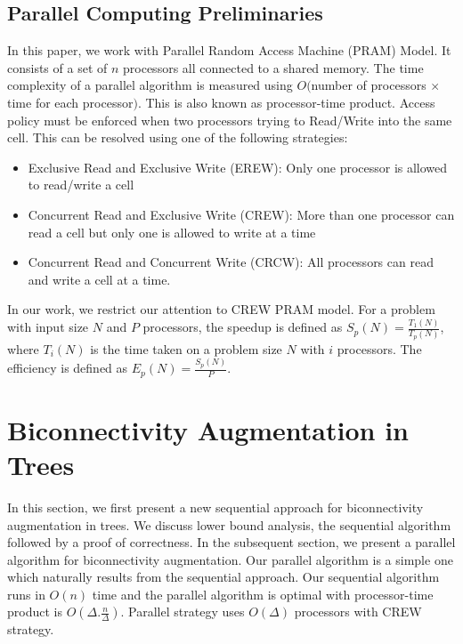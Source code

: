 \documentclass[runningheads]{llncs}
\begin{document}
\subsection{Parallel Computing Preliminaries}
In this paper, we work with Parallel Random Access Machine (PRAM) Model.  It consists of a set of $n$ processors all connected to a shared memory.  The time complexity of a parallel algorithm is measured using $O($number of processors $\times$ time for each processor$)$.  This is also known as processor-time product.  Access policy must be enforced when two processors trying to Read/Write  into the same cell. This can be resolved using one of the following strategies:
\begin{itemize}
\item Exclusive Read and Exclusive Write (EREW): Only one processor is allowed to read/write a cell
\item Concurrent Read and Exclusive Write (CREW): More than one processor can read a cell but only one is allowed to write at a time
\item Concurrent Read and Concurrent Write (CRCW): All processors can read and write a cell at a time.
\end{itemize}
In our work, we restrict our attention to CREW PRAM model.  For a problem with input size $N$ and $P$ processors,  the speedup is defined as $S_p(N)= \frac{T_1(N)}{T_p(N)}$, where $T_i(N)$ is the time taken on a problem size $N$ with $i$ processors.  The efficiency is defined as $E_p(N)=\frac{S_p(N)}{P}$.
\section{Biconnectivity Augmentation in Trees}
\label{treeaugment}
In this section, we first present a new sequential approach for biconnectivity augmentation in trees.  We discuss lower bound analysis, the sequential algorithm followed by a proof of correctness.  In the subsequent section, we present a parallel algorithm for biconnectivity augmentation.  Our parallel algorithm is a simple one which naturally results from the sequential approach.  Our sequential algorithm runs in $O(n)$ time and the parallel algorithm is optimal with processor-time product is $O(\Delta.\frac{n}{\Delta})$.   Parallel strategy uses $O(\Delta)$ processors with CREW strategy.
\end{document}
